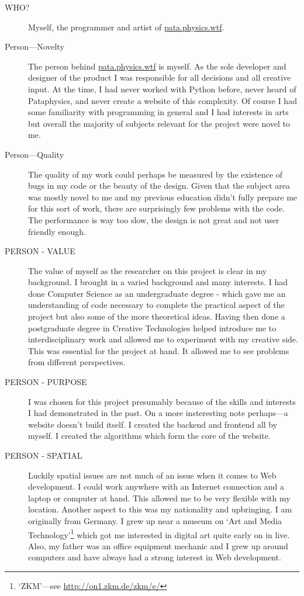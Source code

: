 \begin{description}
  \item[WHO?] Myself, the programmer and artist of \url{pata.physics.wtf}.
  \item[Person---Novelty] The person behind \url{pata.physics.wtf} is myself. As the sole developer and designer of the product I was responsible for all decisions and all creative input. At the time, I had never worked with Python before, never heard of Pataphysics, and never create a website of this complexity. Of course I had some familiarity with programming in general and I had interests in arts but overall the majority of subjects relevant for the project were novel to me.
  \item[Person---Quality] The quality of my work could perhaps be measured by the existence of bugs in my code or the beauty of the design. Given that the subject area was mostly novel to me and my previous education didn't fully prepare me for this sort of work, there are surprisingly few problems with the code.  The performance is way too slow, the design is not great and not user friendly enough.
  \item[PERSON - VALUE] The value of myself as the researcher on this project is clear in my background. I brought in a varied background and many interests. I had done Computer Science as an undergraduate degree - which gave me an understanding of code necessary to complete the practical aspect of the project but also some of the more theoretical ideas. Having then done a postgraduate degree in Creative Technologies helped introduce me to interdisciplinary work and allowed me to experiment with my creative side. This was essential for the project at hand. It allowed me to see problems from different perspectives.
  \item[PERSON - PURPOSE] I was chosen for this project presumably because of the skills and interests I had demonstrated in the past. On a more insteresting note perhaps---a website doesn't build itself. I created the backend and frontend all by myself. I created the algorithms which form the core of the website.
  \item[PERSON - SPATIAL] Luckily spatial issues are not much of an issue when it comes to Web development. I could work anywhere with an Internet connection and a laptop or computer at hand. This allowed me to be very flexible with my location. Another aspect to this was my nationality and upbringing. I am originally from Germany. I grew up near a museum on `Art and Media Technology'\footnote{`ZKM'---see \url{http://on1.zkm.de/zkm/e/}} which got me interested in digital art quite early on in live. Also, my father was an office equipment mechanic and I grew up around computers and have always had a strong interest in Web development.

\end{description}
